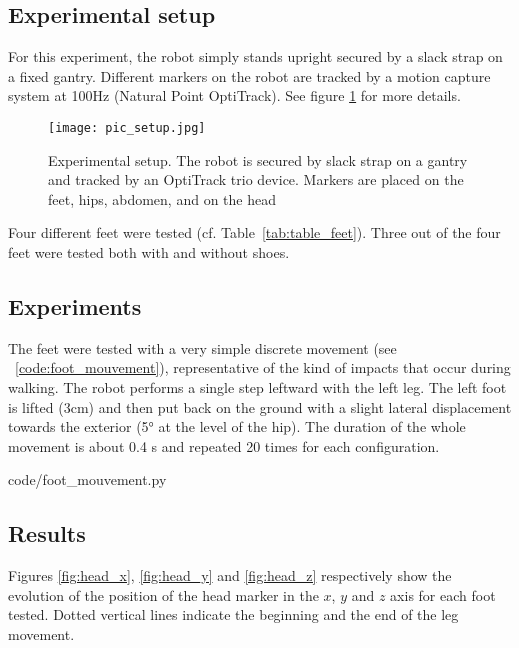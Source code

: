 \subsection{Experimental setup} %
\label{sub:experimental_setup}

For this experiment, the robot simply stands upright secured by a slack strap on a fixed gantry. Different markers on the robot are tracked by a motion capture system at 100Hz (Natural Point OptiTrack). See figure \ref{fig:setup} for more details.

\begin{figure}[ht]
    \begin{center}
        \texttt{[image: pic\_setup.jpg]}
    \end{center}
    \caption{Experimental setup. The robot is secured by slack strap on a gantry and tracked by an OptiTrack trio device. Markers are placed on the feet, hips, abdomen, and on the head}
    \label{fig:setup}
\end{figure}

Four different feet were tested (cf. Table~\ref{tab:table_feet}). Three out of the four feet were tested both with and without shoes.


\subsection{Experiments} %

The feet were tested with a very simple discrete movement (see \codename~\ref{code:foot_mouvement}), representative of the kind of impacts that occur during walking. The robot performs a single step leftward with the left leg. The left foot is lifted (3cm) and then put back on the ground with a slight lateral displacement towards the exterior (5° at the level of the hip). The duration  of the whole movement is about 0.4 s and repeated 20 times for each configuration.


    {code/foot_mouvement.py}


\subsection{Results} %

Figures \ref{fig:head_x}, \ref{fig:head_y} and \ref{fig:head_z} respectively show the evolution of the position of the head marker in the $x$, $y$ and $z$ axis for each foot tested. Dotted vertical lines indicate the beginning and the end of the leg movement.

